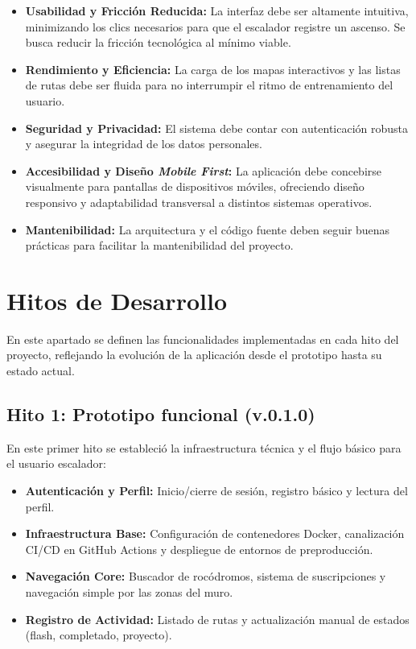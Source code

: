\begin{itemize}
    \item \textbf{Usabilidad y Fricción Reducida:} La interfaz debe ser altamente intuitiva, minimizando los clics necesarios para que el escalador registre un ascenso. Se busca reducir la fricción tecnológica al mínimo viable.
    \item \textbf{Rendimiento y Eficiencia:} La carga de los mapas interactivos y las listas de rutas debe ser fluida para no interrumpir el ritmo de entrenamiento del usuario.
    \item \textbf{Seguridad y Privacidad:} El sistema debe contar con autenticación robusta y asegurar la integridad de los datos personales.
    \item \textbf{Accesibilidad y Diseño \textit{Mobile First}:} La aplicación debe concebirse visualmente para pantallas de dispositivos móviles, ofreciendo diseño responsivo y adaptabilidad transversal a distintos sistemas operativos.
    \item \textbf{Mantenibilidad:} La arquitectura y el código fuente deben seguir buenas prácticas para facilitar la mantenibilidad del proyecto.
\end{itemize}

\section{Hitos de Desarrollo}

En este apartado se definen las funcionalidades implementadas en cada hito del proyecto, reflejando la evolución de la aplicación desde el prototipo hasta su estado actual.

\subsection{Hito 1: Prototipo funcional (v.0.1.0)}
En este primer hito se estableció la infraestructura técnica y el flujo básico para el usuario escalador:
\begin{itemize}
    \item \textbf{Autenticación y Perfil:} Inicio/cierre de sesión, registro básico y lectura del perfil.
    \item \textbf{Infraestructura Base:} Configuración de contenedores Docker, canalización CI/CD en GitHub Actions y despliegue de entornos de preproducción.
    \item \textbf{Navegación Core:} Buscador de rocódromos, sistema de suscripciones y navegación simple por las zonas del muro.
    \item \textbf{Registro de Actividad:} Listado de rutas y actualización manual de estados (flash, completado, proyecto).
\end{itemize}

